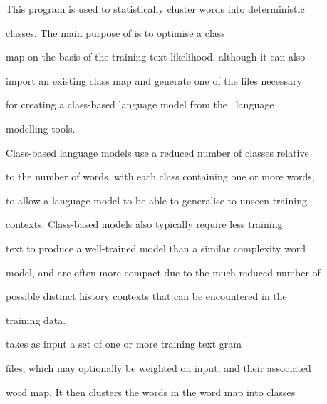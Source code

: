 %




%





\newpage














This program is used to statistically cluster words into deterministic


classes.  The main purpose of  is to optimise a class


map on the basis of the training text likelihood, although it can also


import an existing class map and generate one of the files necessary


for creating a class-based language model from the \HTK\ language


modelling tools.





Class-based language models use a reduced number of classes relative


to the number of words, with each class containing one or more words,


to allow a language model to be able to generalise to unseen training


contexts.  Class-based models also typically require less training


text to produce a well-trained model than a similar complexity word


model, and are often more compact due to the much reduced number of


possible distinct history contexts that can be encountered in the


training data.





 takes as input a set of one or more training text gram


files, which may optionally be weighted on input, and their associated


word map.  It then clusters the words in the word map into classes


